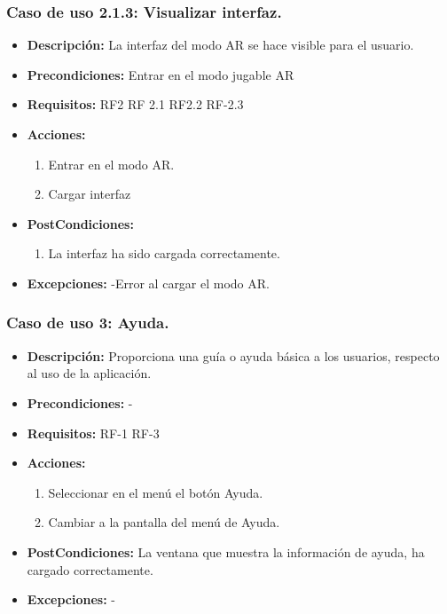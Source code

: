 \subsubsection{Caso de uso  2.1.3: Visualizar interfaz.}
\begin{itemize}
	\item \textbf{Descripción:} La interfaz del modo AR se hace visible para el usuario.
	\item \textbf{Precondiciones:} Entrar en el modo jugable AR
	\item \textbf{Requisitos:} RF2 RF 2.1 RF2.2 RF-2.3
	\item \textbf{Acciones:}
		\begin{enumerate}
			\item Entrar en el modo AR.
			\item Cargar interfaz
		\end{enumerate}
	\item \textbf{PostCondiciones:}
		\begin{enumerate}
			\item La interfaz ha sido cargada correctamente.
		\end{enumerate}
	\item \textbf{Excepciones:} -Error al cargar el modo AR.
\end{itemize}
\subsubsection{Caso de uso 3: Ayuda.}
\begin{itemize}
	\item \textbf{Descripción:} Proporciona una guía o ayuda básica a los usuarios, respecto al uso de la aplicación.
	\item \textbf{Precondiciones:} -
	\item \textbf{Requisitos:} RF-1 RF-3
	\item \textbf{Acciones:}
	\begin{enumerate}
		\item Seleccionar en el menú el botón Ayuda.
		\item Cambiar a la pantalla del menú de Ayuda.
	\end{enumerate}
	\item \textbf{PostCondiciones:} La ventana que muestra la información de ayuda, ha cargado correctamente.
	\item \textbf{Excepciones:} -
\end{itemize}

